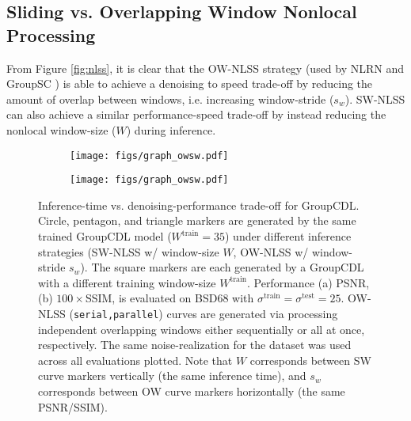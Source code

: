 \documentclass[lettersize,journal]{IEEEtran}
\newcommand{\sigmatrain}{\sigma^{\mathrm{train}}}
\newcommand{\sigmatest}{\sigma^{\mathrm{test}}}
\newcommand{\Wtrain}{W^{\mathrm{train}}}
\begin{document}
\subsection{Sliding vs. Overlapping Window Nonlocal Processing} \label{sec:exp:slidingwindow}
From Figure \ref{fig:nlss}, it is clear that the OW-NLSS strategy 
(used by NLRN \cite{liu2018non} and GroupSC \cite{lecouat2020nonlocal})
is able to achieve a denoising to speed trade-off by reducing the amount of overlap between windows, i.e.
increasing window-stride ($s_w$). SW-NLSS can also achieve a similar performance-speed trade-off by instead 
reducing the nonlocal window-size ($W$) during inference.
\begin{figure}[thb]
    \centering
    \begin{subfigure}{0.4\textwidth}
        \centering
        \texttt{[image: figs/graph\_owsw.pdf]}
    \end{subfigure}
    \hfill 
    \begin{subfigure}{0.4\textwidth}
        \centering
        \texttt{[image: figs/graph\_owsw.pdf]}
    \end{subfigure}
    \caption{
    Inference-time vs. denoising-performance trade-off for GroupCDL. 
    Circle, pentagon, and triangle markers are generated by the same trained GroupCDL model ($\Wtrain = 35$) 
    under different inference strategies (SW-NLSS w/ window-size $W$, OW-NLSS w/ window-stride $s_w$). The square markers are each generated by a GroupCDL with a different training window-size $\Wtrain$. 
    Performance (a) PSNR, (b) $100 \times $SSIM,
    is evaluated on BSD68 \cite{bsd} with $\sigmatrain=\sigmatest=25$. OW-NLSS
    (\texttt{serial,parallel}) curves are generated via processing independent overlapping
    windows either sequentially or all at once, respectively. The same
    noise-realization for the dataset was used across all evaluations plotted.
    Note that $W$ corresponds between SW curve markers vertically (the same inference time), 
    and $s_w$ corresponds between OW curve markers horizontally (the same PSNR/SSIM).
    }
    \label{fig:owsw_curves}
\end{figure}\let\myfig\undefined
\newcommand{\myfig}[3]{\begin{subfigure}{0.24\linewidth}
    \centering
    \texttt{[image: \#1]}
    \caption{#3}
\end{subfigure}}
\end{document}
